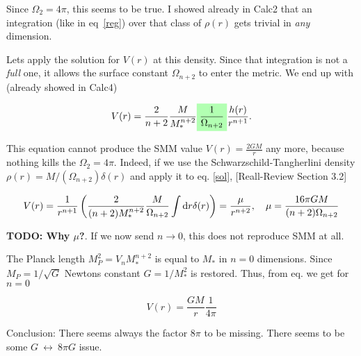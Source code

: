 \documentclass[10pt,a4paper, fleqn]{article}
\newcommand{\highlight}[1]{%
  \colorbox{green!30}{$\displaystyle#1$}}
\begin{document}
Since $\Omega_{2} = 4\pi$, this seems to be true. I showed already in Calc2 that an integration (like in eq~\ref{reg}) over that class of $\rho(r)$ gets trivial in {\it any} dimension.

Lets apply the solution for $V(r)$ at this density. Since that integration is not a {\it full} one, it allows the surface constant $\Omega_{n+2}$ to enter the metric. We end up with (already showed in Calc4)

\begin{equation}
V(r) = \frac{2}{n+2} \frac{M}{M_*^{n+2}} \highlight{\frac{1}{\Omega_{n+2}}} \frac{h(r)}{r^{n+1}}.
\end{equation}

This equation cannot produce the SMM value $V(r) = \frac{2GM}{r}$ any more, because nothing kills the $\Omega_2=4\pi$. Indeed, if we use the Schwarzschild-Tangherlini density $\rho(r) = M / (\Omega_{n+2}) \delta(r)$ and apply it to eq. \ref{sol}, [Reall-Review Section 3.2]

\begin{equation}
V(r) = \frac{1}{r^{n+1}} \left( \frac{2}{(n+2) M_*^{n+2}} \frac{M}{\Omega_{n+2}} \int \mathrm{d} r \delta(r) \right) = \frac{\mu}{r^{n+2}}, \quad \mu = \frac{16\pi G M}{(n+2) \Omega_{n+2}} \label{ST}
\end{equation}

{\bf TODO: Why $\mu$?}. If we now send $n \to 0$, this does not reproduce SMM at all.

The Planck length $M_P^2 = V_n  M_*^{n+2}$ is equal to $M_*$ in $n=0$ dimensions. Since $M_P = 1/\sqrt{G}$ Newtons constant $G = 1/M_*^2$ is restored. Thus, from eq. \label{ST} we get for $n=0$

\begin{equation}
V(r) = \frac{GM}{r}\frac{1}{4\pi}
\end{equation}

Conclusion: There seems always the factor {$8\pi$} to be missing. There seems to be some $G~\leftrightarrow~8\pi G$ issue.
\end{document}

